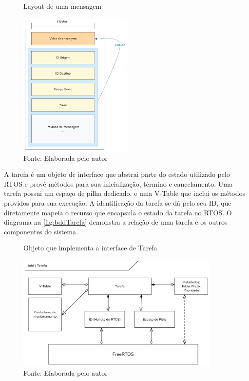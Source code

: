 \begin{figure}[H]
    \centering
    \captionsetup{justification=centering}
    \caption{Layout de uma mensagem}
    \includegraphics[width=0.50\textwidth]{assets/payload_layout.png}
    \captionsetup{justification=raggedright}
    \caption*{Fonte: Elaborada pelo autor}
    \label{fig:messageStruct}
\end{figure}

A tarefa é um objeto de interface que abstrai parte do estado utilizado pelo RTOS e provê métodos para sua inicialização, término e cancelamento. Uma tarefa possui um espaço de pilha dedicado, e uma V-Table que inclui os métodos providos para sua execução. A identificação da tarefa se dá pelo seu ID, que diretamente mapeia o recurso que encapsula o estado da tarefa no RTOS. O diagrama na \autoref{fig:bddTarefa} demonstra a relação de uma tarefa e os outros componentes do sistema.

\begin{figure}[H]
    \centering
    \captionsetup{justification=centering}
    \caption{Objeto que implementa a interface de Tarefa}
    \includegraphics[width=0.90\textwidth]{assets/task_bdd.png}
    \captionsetup{justification=raggedright}
    \caption*{Fonte: Elaborada pelo autor}
    \label{fig:bddTarefa}
\end{figure}


